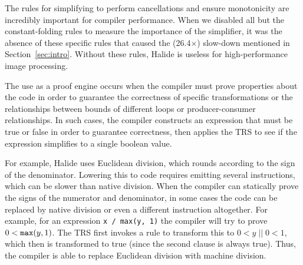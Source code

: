 The rules for simplifying to perform cancellations and
  ensure monotonicity are incredibly important for compiler
  performance. When we disabled all but the constant-folding rules to
  measure the importance of the simplifier, it was the absence of
  these specific rules that caused the (26.4$\times$) slow-down
  mentioned in Section~\ref{sec:intro}. Without these rules,
  Halide is useless for high-performance image
  processing.


The use as a proof engine occurs when the compiler must prove properties about the code in order to guarantee the
  correctness of specific transformations or the relationships between bounds of
  different loops or producer-consumer relationships.  In such cases, the compiler constructs
  an expression that must be true or false in order to guarantee correctness, then applies
  the TRS to see if the expression simplifies to a single boolean value.

For example, Halide uses Euclidean division, which rounds according to the sign of the
  denominator.  Lowering this to code requires emitting several instructions, which can be
  slower than native division.  When the compiler can statically prove the signs of the numerator
  and denominator, in some cases the code can be replaced by native division or even a different
  instruction altogether.  For example, for an expression \texttt{x / max(y, 1)} the compiler
  will try to prove $0 < \texttt{max}(y, 1)$.  The TRS first invokes a rule to transform this to
  $0 < y\; ||\; 0 < 1$, which then is transformed to true (since the second clause is always true).
  Thus, the compiler is able to replace Euclidean division with machine division.

